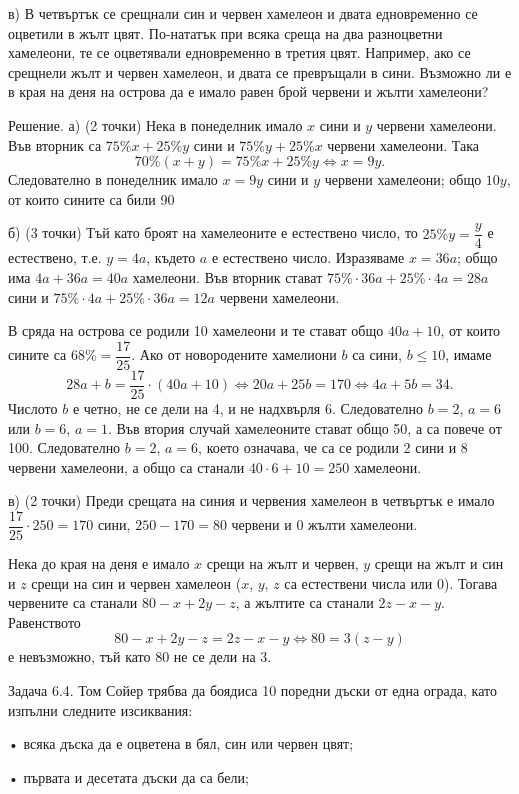 в) В четвъртък се срещнали син и червен хамелеон и двата едновременно се оцветили в жълт цвят. По-нататък при всяка среща на два разноцветни хамелеони, те се оцветявали едновременно в третия цвят. Например, ако се срещнели жълт и червен хамелеон, и двата се превръщали в сини. Възможно ли е в края на деня на острова да е имало равен брой червени и жълти хамелеони?

Решение. а) (2 точки) Нека в понеделник имало $x$ сини и $y$ червени хамелеони. Във вторник са $75\%x+25\%y$ сини и $75\%y+25\%x$ червени хамелеони. Така
$$
70\%(x+y)=75\%x+25\%y\Longleftrightarrow x=9y.
$$
Следователно в понеделник имало $x=9y$ сини и $y$ червени хамелеони; общо $10y$, от които сините са били 90%

б) (3 точки) Тъй като броят на хамелеоните е естествено число, то $25\%y=\dfrac y4$ е естествено, т.е. $y=4a$, където $a$ е естествено число. Изразяваме $x=36a$; общо има $4a+36a=40a$ хамелеони. Във вторник стават $75\%\cdot36a+25\%\cdot4a=28a$ сини и $75\%\cdot4a+25\%\cdot36a=12a$ червени хамелеони.

В сряда на острова се родили 10 хамелеони и те стават общо $40a+10$, от които сините са $68\%=\dfrac{17}{25}$. Ако от новородените хамелиони $b$ са сини, $b\leq10$, имаме
$$
28a+b=\frac{17}{25}\cdot(40a+10)\Longleftrightarrow20a+25b=170\Longleftrightarrow4a+5b=34.
$$
Числото $b$ е четно, не се дели на 4, и не надхвърля 6. Следователно $b=2$, $a=6$ или $b=6$, $a=1$. Във втория случай хамелеоните стават общо 50, а са повече от 100. Следователно $b=2$, $a=6$, което означава, че са се родили 2 сини и 8 червени хамелеони, а общо са станали $40\cdot6+10=250$ хамелеони.

в) (2 точки) Преди срещата на синия и червения хамелеон в четвъртък е имало $\dfrac{17}{25}\cdot250=170$ сини, $250-170=80$ червени и 0 жълти хамелеони.

Нека до края на деня е имало $x$ срещи на жълт и червен, $y$ срещи на жълт и син и $z$ срещи на син и червен хамелеон ($x$, $y$, $z$ са естествени числа или 0). Тогава червените са станали $80-x+2y-z$, а жълтите са станали $2z-x-y$. Равенството
$$
80-x+2y-z=2z-x-y\Longleftrightarrow80=3(z-y)
$$
е невъзможно, тъй като 80 не се дели на 3.

Задача 6.4. Том Сойер трябва да боядиса 10 поредни дъски от една ограда, като изпълни следните изсиквания:

• всяка дъска да е оцветена в бял, син или червен цвят;

• първата и десетата дъски да са бели;

